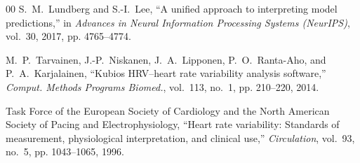 \documentclass[conference]{IEEEtran}
\begin{document}
\begin{thebibliography}{00}
S.~M.~Lundberg and S.-I.~Lee, ``A unified approach to interpreting model predictions,'' in \textit{Advances in Neural Information Processing Systems (NeurIPS)}, vol.~30, 2017, pp. 4765--4774.

M.~P.~Tarvainen, J.-P.~Niskanen, J.~A.~Lipponen, P.~O.~Ranta-Aho, and P.~A.~Karjalainen, ``Kubios HRV--heart rate variability analysis software,'' \textit{Comput. Methods Programs Biomed.}, vol.~113, no.~1, pp. 210--220, 2014.

Task Force of the European Society of Cardiology and the North American Society of Pacing and Electrophysiology, ``Heart rate variability: Standards of measurement, physiological interpretation, and clinical use,'' \textit{Circulation}, vol.~93, no.~5, pp. 1043--1065, 1996.
\end{thebibliography}
\end{document}
